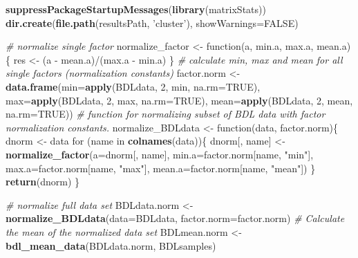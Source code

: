 \documentclass[]{article}
\newenvironment{Shaded}{\begin{snugshade}}{\end{snugshade}}
\newcommand{\KeywordTok}[1]{\textcolor[rgb]{0.13,0.29,0.53}{\textbf{{#1}}}}
\newcommand{\DataTypeTok}[1]{\textcolor[rgb]{0.13,0.29,0.53}{{#1}}}
\newcommand{\DecValTok}[1]{\textcolor[rgb]{0.00,0.00,0.81}{{#1}}}
\newcommand{\StringTok}[1]{\textcolor[rgb]{0.31,0.60,0.02}{{#1}}}
\newcommand{\CommentTok}[1]{\textcolor[rgb]{0.56,0.35,0.01}{\textit{{#1}}}}
\newcommand{\OtherTok}[1]{\textcolor[rgb]{0.56,0.35,0.01}{{#1}}}
\newcommand{\NormalTok}[1]{{#1}}
\begin{document}
\begin{Shaded}
\begin{Highlighting}[]
\KeywordTok{suppressPackageStartupMessages}\NormalTok{(}\KeywordTok{library}\NormalTok{(matrixStats))}
\KeywordTok{dir.create}\NormalTok{(}\KeywordTok{file.path}\NormalTok{(resultsPath, }\StringTok{'cluster'}\NormalTok{), }\DataTypeTok{showWarnings=}\OtherTok{FALSE}\NormalTok{)}

\CommentTok{# normalize single factor}
\NormalTok{normalize_factor <-}\StringTok{ }\NormalTok{function(a, min.a, max.a, mean.a)\{}
  \NormalTok{res <-}\StringTok{ }\NormalTok{(a -}\StringTok{ }\NormalTok{mean.a)/(max.a -}\StringTok{ }\NormalTok{min.a)}
\NormalTok{\}}
\CommentTok{# calculate min, max and mean for all single factors (normalization constants)}
\NormalTok{factor.norm <-}\StringTok{ }\KeywordTok{data.frame}\NormalTok{(}\DataTypeTok{min=}\KeywordTok{apply}\NormalTok{(BDLdata, }\DecValTok{2}\NormalTok{, min, }\DataTypeTok{na.rm=}\OtherTok{TRUE}\NormalTok{), }
                            \DataTypeTok{max=}\KeywordTok{apply}\NormalTok{(BDLdata, }\DecValTok{2}\NormalTok{, max, }\DataTypeTok{na.rm=}\OtherTok{TRUE}\NormalTok{),}
                            \DataTypeTok{mean=}\KeywordTok{apply}\NormalTok{(BDLdata, }\DecValTok{2}\NormalTok{, mean, }\DataTypeTok{na.rm=}\OtherTok{TRUE}\NormalTok{))}
\CommentTok{# function for normalizing subset of BDL data with factor normalization constants.}
\NormalTok{normalize_BDLdata <-}\StringTok{ }\NormalTok{function(data, factor.norm)\{}
  \NormalTok{dnorm <-}\StringTok{ }\NormalTok{data}
  \NormalTok{for (name in }\KeywordTok{colnames}\NormalTok{(data))\{}
    \NormalTok{dnorm[, name] <-}\StringTok{ }\KeywordTok{normalize_factor}\NormalTok{(}\DataTypeTok{a=}\NormalTok{dnorm[, name], }
                                      \DataTypeTok{min.a=}\NormalTok{factor.norm[name, }\StringTok{"min"}\NormalTok{], }
                                      \DataTypeTok{max.a=}\NormalTok{factor.norm[name, }\StringTok{"max"}\NormalTok{],}
                                      \DataTypeTok{mean.a=}\NormalTok{factor.norm[name, }\StringTok{"mean"}\NormalTok{]) }
  \NormalTok{\}}
  \KeywordTok{return}\NormalTok{(dnorm)}
\NormalTok{\}}

\CommentTok{# normalize full data set}
\NormalTok{BDLdata.norm <-}\StringTok{ }\KeywordTok{normalize_BDLdata}\NormalTok{(}\DataTypeTok{data=}\NormalTok{BDLdata, }\DataTypeTok{factor.norm=}\NormalTok{factor.norm)}
\CommentTok{# Calculate the mean of the normalized data set}
\NormalTok{BDLmean.norm <-}\StringTok{ }\KeywordTok{bdl_mean_data}\NormalTok{(BDLdata.norm, BDLsamples)}
\end{Highlighting}
\end{Shaded}
\end{document}
